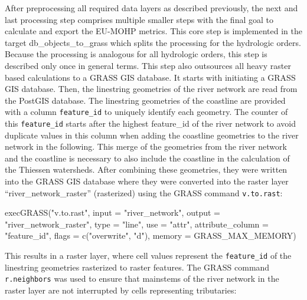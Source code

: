 \documentclass[fleqn,10pt]{wlscirep}
\newenvironment{Shaded}{\begin{snugshade}}{\end{snugshade}}
\newcommand{\AttributeTok}[1]{\textcolor[rgb]{0.77,0.63,0.00}{#1}}
\newcommand{\FunctionTok}[1]{\textcolor[rgb]{0.00,0.00,0.00}{#1}}
\newcommand{\NormalTok}[1]{#1}
\newcommand{\StringTok}[1]{\textcolor[rgb]{0.31,0.60,0.02}{#1}}
\begin{document}
After preprocessing all required data layers as described previously, the next and last processing step comprises multiple smaller steps with the final goal to calculate and export the EU-MOHP metrics. This core step is implemented in the target db\_objects\_to\_grass which splits the processing for the hydrologic orders. Because the processing is analogous for all hydrologic orders, this step is described only once in general terms. This step also outsources all heavy raster based calculations to a GRASS GIS database. It starts with initiating a GRASS GIS database. Then, the linestring geometries of the river network are read from the PostGIS database.
The linestring geometries of the coastline are provided with a column \texttt{feature\_id} to uniquely identify each geometry. The counter of this \texttt{feature\_id} starts after the highest feature\_id of the river network to avoid duplicate values in this column when adding the coastline geometries to the river network in the following. This merge of the geometries from the river network and the coastline is necessary to also include the coastline in the calculation of the Thiessen watersheds.
After combining these geometries, they were written into the GRASS GIS database where they were converted into the raster layer ``river\_network\_raster'' (rasterized) using the GRASS command \texttt{v.to.rast}:

\footnotesize

\begin{Shaded}
\begin{Highlighting}[]
\FunctionTok{execGRASS}\NormalTok{(}\StringTok{"v.to.rast"}\NormalTok{, }
         \AttributeTok{input =} \StringTok{"river\_network"}\NormalTok{, }
         \AttributeTok{output =} \StringTok{"river\_network\_raster"}\NormalTok{,}
         \AttributeTok{type =} \StringTok{"line"}\NormalTok{,}
         \AttributeTok{use =} \StringTok{"attr"}\NormalTok{,}
         \AttributeTok{attribute\_column =} \StringTok{"feature\_id"}\NormalTok{,}
         \AttributeTok{flags =} \FunctionTok{c}\NormalTok{(}\StringTok{"overwrite"}\NormalTok{, }\StringTok{"d"}\NormalTok{),}
         \AttributeTok{memory =}\NormalTok{ GRASS\_MAX\_MEMORY)}
\end{Highlighting}
\end{Shaded}

\normalsize

This results in a raster layer, where cell values represent the \texttt{feature\_id} of the linestring geometries rasterized to raster features.
The GRASS command \texttt{r.neighbors} was used to ensure that mainstems of the river network in the raster layer are not interrupted by cells representing tributaries:
\end{document}
